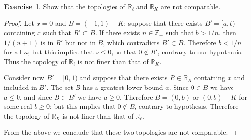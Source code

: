 \documentclass[11pt,a4paper,twoside]{article}
\theoremstyle{definition}
\newcounter{excounter}
\newtheorem{exercise}[excounter]{Exercise}
\begin{document}
\begin{exercise}

Show that the topologies of $\mathbb{R}_\ell$ and $\mathbb{R}_K$ are not comparable.

\end{exercise}

\begin{proof}

  Let $x = 0$ and $B = ( {-1}, 1 ) - K$; suppose that there exists $B' = [ a, b )$ containing $x$ such that $B' \subset B$.
  If there exists $n \in \mathbb{Z}_+$ such that $b > 1 / n$, then $1 / ( n + 1 )$ is in $B'$ but not in $B$, which
  contradicts $B' \subset B$. Therefore $b < 1 / n$ for all $n$; but this implies that $b \leq 0$, so that $0 \notin B'$,
  contrary to our hypothesis. Thus the topology of $\mathbb{R}_\ell$ is not finer than that of $\mathbb{R}_K$.

  Consider now $B' = [ 0, 1 )$ and suppose that there exists $B \in \mathbb{R}_K$ containing $x$ and included in $B'$.
  The set $B$ has a greatest lower bound $a$. Since $0 \in B$ we have $a \leq 0$, and since $B \subset B'$ we have $a \geq 0$.
  Therefore $B = ( 0, b )$ or $( 0, b ) - K$ for some real $b \geq 0$; but this implies that $0 \notin B$, contrary to
  hypothesis. Therefore the topology of $\mathbb{R}_K$ is not finer than that of $\mathbb{R}_\ell$.

  From the above we conclude that these two topologies are not comparable.

\end{proof}
\end{document}
